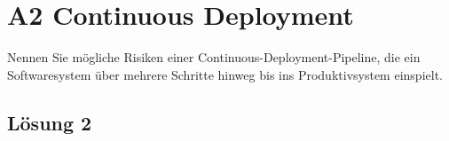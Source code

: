 \documentclass[main.tex]{subfiles}
\begin{document}
\section{A2 Continuous Deployment}
Nennen Sie mögliche Risiken einer Continuous-Deployment-Pipeline, die ein Softwaresystem
über mehrere Schritte hinweg bis ins Produktivsystem einspielt.

\subsection{Lösung 2}
\end{document}
